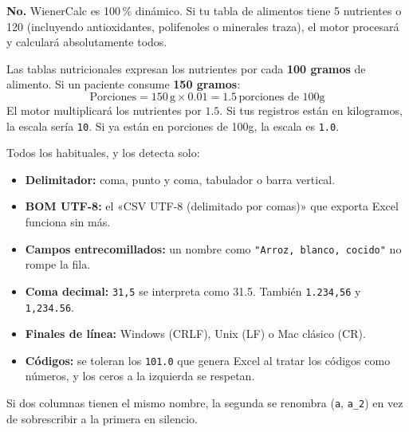 \documentclass[11pt,a4paper]{article}
\begin{document}
\begin{faqbox}
\textbf{No.} WienerCalc es 100\,\% dinámico. Si tu tabla de alimentos tiene 5 nutrientes o 120 (incluyendo antioxidantes, polifenoles o minerales traza), el motor procesará y calculará absolutamente todos.
\end{faqbox}

\vspace{0.3cm}

\begin{tipbox}
Las tablas nutricionales expresan los nutrientes por cada \textbf{100 gramos} de alimento.
Si un paciente consume \textbf{150 gramos}:
$$\text{Porciones} = 150\,\text{g} \times 0.01 = 1.5\,\text{porciones de 100g}$$
El motor multiplicará los nutrientes por $1.5$. Si tus registros están en kilogramos, la escala sería \texttt{10}. Si ya están en porciones de 100g, la escala es \texttt{1.0}.
\end{tipbox}

\vspace{0.3cm}

\begin{faqbox}
Todos los habituales, y los detecta solo:
\begin{itemize}[label=\textcolor{aeroemerald}{$\checkmark$}]
    \item \textbf{Delimitador:} coma, punto y coma, tabulador o barra vertical.
    \item \textbf{BOM UTF-8:} el «CSV UTF-8 (delimitado por comas)» que exporta Excel funciona sin más.
    \item \textbf{Campos entrecomillados:} un nombre como \texttt{"Arroz, blanco, cocido"} no rompe la fila.
    \item \textbf{Coma decimal:} \texttt{31,5} se interpreta como 31.5. También \texttt{1.234,56} y \texttt{1,234.56}.
    \item \textbf{Finales de línea:} Windows (CRLF), Unix (LF) o Mac clásico (CR).
    \item \textbf{Códigos:} se toleran los \texttt{101.0} que genera Excel al tratar los códigos como números, y los ceros a la izquierda se respetan.
\end{itemize}
Si dos columnas tienen el mismo nombre, la segunda se renombra (\texttt{a}, \texttt{a\_2}) en vez de sobrescribir a la primera en silencio.
\end{faqbox}
\end{document}
